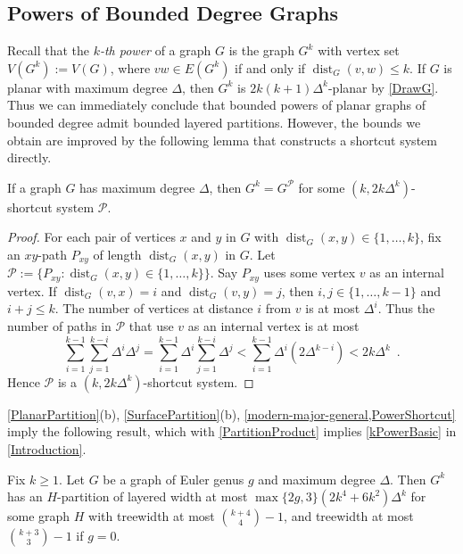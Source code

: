 \documentclass{patmorin}
\DeclareMathOperator{\dist}{dist}
\newcommand{\PP}{\mathcal{P}}
\renewcommand{\geq}{\geqslant}
\renewcommand{\leq}{\leqslant}
\begin{document}
\subsection{Powers of Bounded Degree Graphs}
\label{Powers}

Recall that the \emph{$k$-th power} of a graph $G$ is the graph $G^k$ with vertex set $V(G^k):=V(G)$, where $vw\in E(G^k)$ if and only if $\dist_G(v,w)\leq k$. If $G$ is planar with maximum degree $\Delta$, then $G^k$ is $2k(k+1)\Delta^{k}$-planar by \cref{DrawG}. Thus we can immediately conclude that bounded powers of planar graphs of bounded degree admit bounded layered partitions. However, the bounds we obtain are improved by the following lemma that constructs a shortcut system directly. 

\begin{lem}
\label{PowerShortcut}
If a graph $G$ has maximum degree $\Delta$, then $G^k = G^\PP$ for some $(k,2k \Delta^{k})$-shortcut system $\PP$.
\end{lem}

\begin{proof}
For each pair of vertices $x$ and $y$ in $G$ with $\dist_G(x,y)\in\{1,\dots,k\}$, fix an $xy$-path $P_{xy}$ of length 
$\dist_G(x,y)$  in $G$. Let $\PP:=\{P_{xy}: \dist_G(x,y)\in\{1,\dots,k\} \}$. Say $P_{xy}$ uses some vertex $v$ as an internal vertex. If $\dist_G(v,x)=i$ and $\dist_G(v,y)=j$, then $i,j\in\{1,\dots,k-1\}$ and $i+j\leq k$. The number of vertices at distance $i$ from $v$ is at most $\Delta^i$. Thus the number of paths in $\PP$ that use $v$ as an internal vertex is at most 
\[\sum_{i=1}^{k-1} \sum_{j=1}^{k-i} \Delta^i\Delta^j 
= \sum_{i=1}^{k-1} \Delta^i \sum_{j=1}^{k-i} \Delta^j 
< \sum_{i=1}^{k-1} \Delta^i ( 2 \Delta^{k-i} )
< 2k \Delta^k\enspace.\]
Hence $\PP$ is a $(k, 2k \Delta^k)$-shortcut system. 
\end{proof}

\cref{PlanarPartition}(b), \cref{SurfacePartition}(b), \cref{modern-major-general,PowerShortcut} imply the following result, which with \cref{PartitionProduct} implies \cref{kPowerBasic} in \cref{Introduction}.

\begin{thm}
\label{PowerPartition}
Fix $k\geq 1$. Let $G$ be a graph of Euler genus $g$ and maximum degree $\Delta$. 
Then $G^k$ has an $H$-partition of layered width at most $\max\{2g,3\} (2k^4+6k^2) \Delta^{k}$ 
for some graph $H$ with treewidth at most $\binom{k+4}{4}-1$, and treewidth 
at most $\binom{k+3}{3}-1$ if $g=0$. 
\end{thm}
\end{document}
